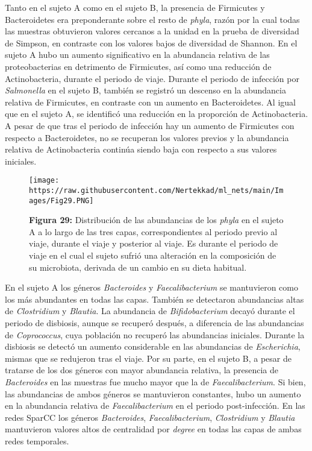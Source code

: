 \documentclass[
]{book}
\begin{document}
Tanto en el sujeto A como en el sujeto B, la presencia de Firmicutes y Bacteroidetes era preponderante sobre el resto de \emph{phyla}, razón por la cual todas las muestras obtuvieron valores cercanos a la unidad en la prueba de diversidad de Simpson, en contraste con los valores bajos de diversidad de Shannon. En el sujeto A hubo un aumento significativo en la abundancia relativa de las proteobacterias en detrimento de Firmicutes, así como una reducción de Actinobacteria, durante el periodo de viaje. Durante el periodo de infección por \emph{Salmonella} en el sujeto B, también se registró un descenso en la abundancia relativa de Firmicutes, en contraste con un aumento en Bacteroidetes. Al igual que en el sujeto A, se identificó una reducción en la proporción de Actinobacteria. A pesar de que tras el periodo de infección hay un aumento de Firmicutes con respecto a Bacteroidetes, no se recuperan los valores previos y la abundancia relativa de Actinobacteria continúa siendo baja con respecto a sus valores iniciales.

\begin{figure}
\centering
\texttt{[image: https://raw.githubusercontent.com/Nertekkad/ml\_nets/main/Images/Fig29.PNG]}
\caption{\textbf{Figura 29:} Distribución de las abundancias de los \emph{phyla} en el sujeto A a lo largo de las tres capas, correspondientes al periodo previo al viaje, durante el viaje y posterior al viaje. Es durante el periodo de viaje en el cual el sujeto sufrió una alteración en la composición de su microbiota, derivada de un cambio en su dieta habitual.}
\end{figure}

En el sujeto A los géneros \emph{Bacteroides} y \emph{Faecalibacterium} se mantuvieron como los más abundantes en todas las capas. También se detectaron abundancias altas de \emph{Clostridium} y \emph{Blautia}. La abundancia de \emph{Bifidobacterium} decayó durante el periodo de disbiosis, aunque se recuperó después, a diferencia de las abundancias de \emph{Coprococcus}, cuya población no recuperó las abundancias iniciales. Durante la disbiosis se detectó un aumento considerable en las abundancias de \emph{Escherichia}, mismas que se redujeron tras el viaje. Por su parte, en el sujeto B, a pesar de tratarse de los dos géneros con mayor abundancia relativa, la presencia de \emph{Bacteroides} en las muestras fue mucho mayor que la de \emph{Faecalibacterium}. Si bien, las abundancias de ambos géneros se mantuvieron constantes, hubo un aumento en la abundancia relativa de \emph{Faecalibacterium} en el periodo post-infección. En las redes SparCC los géneros \emph{Bacteroides}, \emph{Faecalibacterium}, \emph{Clostridium} y \emph{Blautia} mantuvieron valores altos de centralidad por \emph{degree} en todas las capas de ambas redes temporales.
\end{document}
